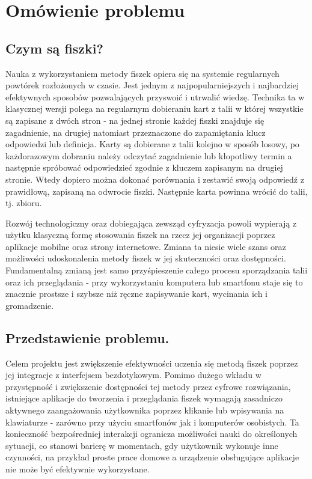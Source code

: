 \chapter{Omówienie problemu}

\section{Czym są fiszki?}

Nauka z wykorzystaniem metody fiszek opiera się na systemie regularnych powtórek rozłożonych w czasie. Jest jednym z najpopularniejszych i najbardziej efektywnych sposobów pozwalających przyswoić i utrwalić wiedzę. Technika ta w klasycznej wersji polega na regularnym dobieraniu kart z talii w której wszystkie są zapisane z dwóch stron - na jednej stronie każdej fiszki znajduje się zagadnienie, na drugiej natomiast przeznaczone do zapamiętania klucz odpowiedzi lub definicja. Karty są dobierane z talii kolejno w sposób losowy, po każdorazowym dobraniu należy odczytać zagadnienie lub kłopotliwy termin a następnie spróbować odpowiedzieć zgodnie z kluczem zapisanym na drugiej stronie. Wtedy dopiero można dokonać porównania i zestawić swoją odpowiedź z prawidłową, zapisaną na odwrocie fiszki. Następnie karta powinna wrócić do talii, tj. zbioru.

Rozwój technologiczny oraz dobiegająca zewsząd cyfryzacja powoli wypierają z użytku klasyczną formę stosowania fiszek na rzecz jej organizacji poprzez aplikacje mobilne oraz strony internetowe. Zmiana ta niesie wiele szans oraz możliwości udoskonalenia metody fiszek w jej skuteczności oraz dostępności. Fundamentalną zmianą jest samo przyśpieszenie całego procesu sporządzania talii oraz ich przeglądania - przy wykorzystaniu komputera lub smartfonu staje się to znacznie prostsze i szybsze niż ręczne zapisywanie kart, wycinania ich i gromadzenie.

\section{Przedstawienie problemu.}
Celem projektu jest zwiększenie efektywności uczenia się metodą fiszek poprzez jej integracje z interfejsem bezdotykowym. Pomimo dużego wkładu w przystępność i zwiększenie dostępności tej metody przez cyfrowe rozwiązania, istniejące aplikacje do tworzenia i przeglądania fiszek wymagają zasadniczo aktywnego zaangażowania użytkownika poprzez klikanie lub wpisywania na klawiaturze - zarówno przy użyciu smartfonów jak i komputerów osobistych. Ta konieczność bezpośredniej interakcji ogranicza możliwości nauki do określonych sytuacji, co stanowi barierę w momentach, gdy użytkownik wykonuje inne czynności, na przykład proste prace domowe a urządzenie obsługujące aplikacje nie może być efektywnie wykorzystane.


